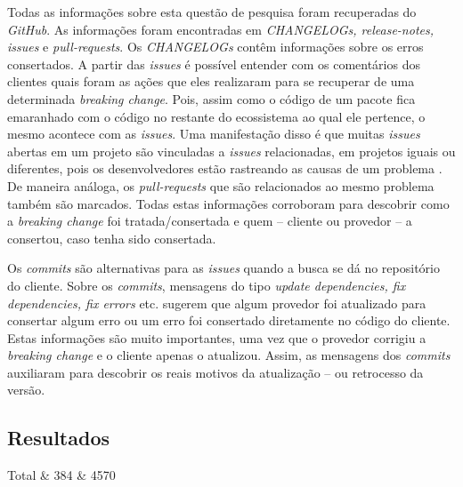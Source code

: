Todas as informações sobre esta questão de pesquisa foram recuperadas do \textit{GitHub}. As informações foram encontradas em \textit{CHANGELOGs, release-notes, issues} e \textit{pull-requests}. Os \textit{CHANGELOGs} contêm informações sobre os erros consertados. A partir das \textit{issues} é possível entender com os comentários dos clientes quais foram as ações que eles realizaram para se recuperar de uma determinada \textit{breaking change}. Pois, assim como o código de um pacote fica emaranhado com o código no restante do ecossistema ao qual ele pertence, o mesmo acontece com as \textit{issues}. Uma manifestação disso é que muitas \textit{issues} abertas em um projeto são vinculadas a \textit{issues} relacionadas, em projetos iguais ou diferentes, pois os desenvolvedores estão rastreando as causas de um problema \cite{Zhang:2018:WIL:3242887.3242891}. De maneira análoga, os \textit{pull-requests} que são relacionados ao mesmo problema também são marcados. Todas estas informações corroboram para descobrir como a \textit{breaking change} foi tratada/consertada e quem -- cliente ou provedor -- a consertou, caso tenha sido consertada.

Os \textit{commits} são alternativas para as \textit{issues} quando a busca se dá no repositório do cliente. Sobre os \textit{commits}, mensagens do tipo \textit{update dependencies, fix dependencies, fix errors} etc. sugerem que algum provedor foi atualizado para consertar algum erro ou um erro foi consertado diretamente no código do cliente. Estas informações são muito importantes, uma vez que o provedor corrigiu a \textit{breaking change} e o cliente apenas o atualizou. Assim, as mensagens dos \textit{commits} auxiliaram para descobrir os reais motivos da atualização -- ou retrocesso da versão.

\subsection{Resultados}
\label{d_fin:rq3}



    Total           & 384     & 4570     \\

